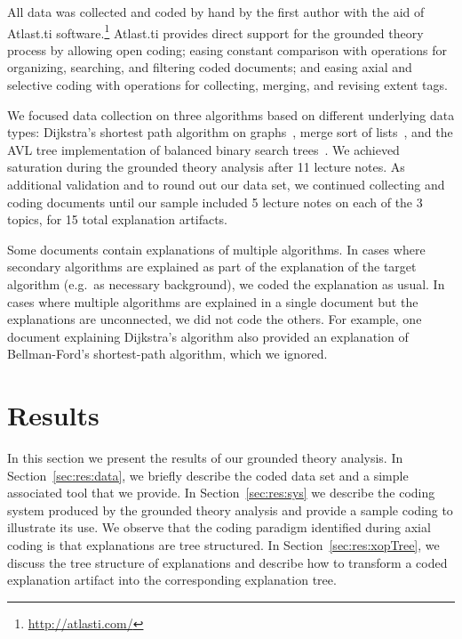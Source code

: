 \documentclass[sigconf]{acmart}
\begin{document}
All data was collected and coded by hand by the first author with the aid of
Atlast.ti software.\footnote{\url{http://atlasti.com/}}
%
Atlast.ti provides direct support for the grounded theory process by allowing
open coding; easing constant comparison with operations for organizing,
searching, and filtering coded documents; and easing axial and selective coding
with operations for collecting, merging, and revising extent tags.


We focused data collection on three algorithms based on different underlying
data types: Dijkstra's shortest path algorithm on
graphs~\cite[pp.~137--142]{KT06}, merge sort of lists~\cite[210--214]{KT06},
and the AVL tree implementation of balanced binary search
trees~\cite[pp.~458--475]{KnuthArt3}.
%
We achieved saturation during the grounded theory analysis after 11 lecture
notes. As additional validation and to round out our data set, we continued
collecting and coding documents until our sample included 5 lecture notes on
each of the 3 topics, for 15 total explanation artifacts.


Some documents contain explanations of multiple algorithms. In cases where
secondary algorithms are explained as part of the explanation of the target
algorithm (e.g.\ as necessary background), we coded the explanation as usual.
In cases where multiple algorithms are explained in a single document but the
explanations are unconnected, we did not code the others. For example, one
document explaining Dijkstra's algorithm also provided an explanation of
Bellman-Ford's shortest-path algorithm, which we ignored.





\section{Results}
\label{sec:res}

In this section we present the results of our grounded theory analysis.
%
In Section~\ref{sec:res:data}, we briefly describe the coded data set and a
simple associated tool that we provide.
%
In Section~\ref{sec:res:sys} we describe the coding system produced by the
grounded theory analysis and provide a sample coding to illustrate its use. We
observe that the coding paradigm identified during axial coding is that
explanations are tree structured.
%
In Section~\ref{sec:res:xopTree}, we discuss the tree structure of explanations
and describe how to transform a coded explanation artifact into the
corresponding explanation tree.
\end{document}
